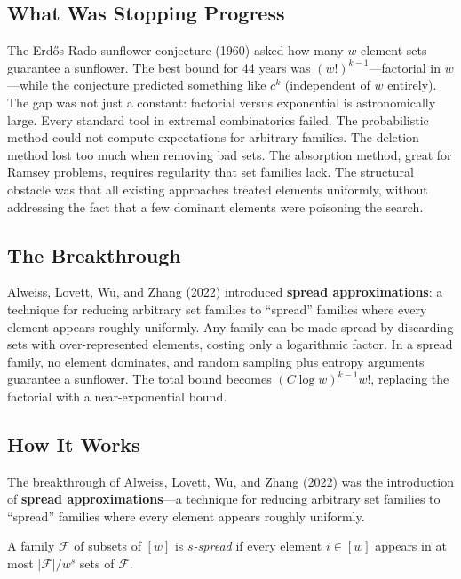 \subsection{What Was Stopping Progress}

The Erd\H{o}s-Rado sunflower conjecture (1960) asked how many $w$-element sets guarantee a sunflower. The best bound for 44 years was $(w!)^{k-1}$---factorial in $w$---while the conjecture predicted something like $c^k$ (independent of $w$ entirely). The gap was not just a constant: factorial versus exponential is astronomically large. Every standard tool in extremal combinatorics failed. The probabilistic method could not compute expectations for arbitrary families. The deletion method lost too much when removing bad sets. The absorption method, great for Ramsey problems, requires regularity that set families lack. The structural obstacle was that all existing approaches treated elements uniformly, without addressing the fact that a few dominant elements were poisoning the search.

\subsection{The Breakthrough}

Alweiss, Lovett, Wu, and Zhang (2022) introduced \textbf{spread approximations}: a technique for reducing arbitrary set families to ``spread'' families where every element appears roughly uniformly. Any family can be made spread by discarding sets with over-represented elements, costing only a logarithmic factor. In a spread family, no element dominates, and random sampling plus entropy arguments guarantee a sunflower. The total bound becomes $(C \log w)^{k-1} w!$, replacing the factorial with a near-exponential bound.

\subsection{How It Works}

The breakthrough of Alweiss, Lovett, Wu, and Zhang (2022) \cite{alweiss2022} was the introduction of \textbf{spread approximations}---a technique for reducing arbitrary set families to ``spread'' families where every element appears roughly uniformly.

\begin{definition}
A family $\mathcal{F}$ of subsets of $[w]$ is \emph{$s$-spread} if every element $i \in [w]$ appears in at most $|\mathcal{F}| / w^s$ sets of $\mathcal{F}$.
\end{definition}

